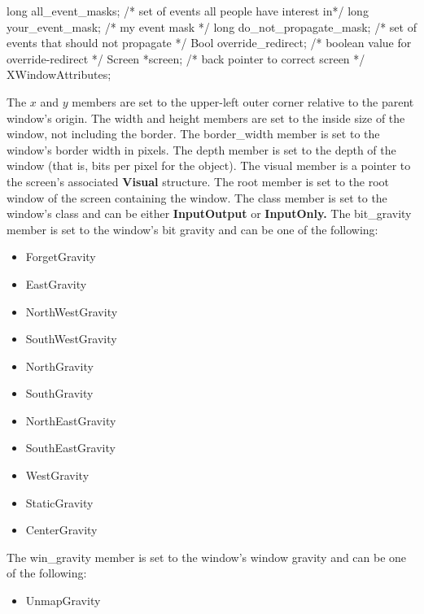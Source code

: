 \documentclass{report}
\begin{document}
\begin{itemize}
\begin{cppcode}
{                    long all_event_masks;               /* set of events all people have interest in*/
                    long your_event_mask;               /* my event mask */
                    long do_not_propagate_mask;         /* set of events that should not propagate */
                    Bool override_redirect;             /* boolean value for override-redirect */
                    Screen *screen;                     /* back pointer to correct screen */
                } XWindowAttributes;
            \end{cppcode}
            \bigbreak \noindent 
            The $x$ and $y$ members are set to the upper-left outer corner relative to the parent window’s origin. The width and height members are set to the inside size of the window, not including the border. The border\_width member is set to the window’s border width in pixels. The depth member is set to the depth of the window (that is, bits per pixel for the object). The visual member is a pointer to the screen’s associated \textbf{Visual} structure. The root member is set to the root window of the screen containing the window. The class member is set to the window’s class and can be either \textbf{InputOutput} or \textbf{InputOnly.}
            \bigbreak \noindent 
            The bit\_gravity member is set to the window’s bit gravity and can be one of the following:
            \begin{itemize}
                \item ForgetGravity 
                \item EastGravity
                \item NorthWestGravity 
                \item SouthWestGravity
                \item NorthGravity 
                \item SouthGravity
                \item NorthEastGravity 
                \item SouthEastGravity
                \item WestGravity 
                \item StaticGravity
                \item CenterGravity
            \end{itemize}
            The win\_gravity member is set to the window’s window gravity and can be one of the following:
            \begin{itemize}
                \item UnmapGravity 

\end{itemize}
\end{itemize}
\end{document}
